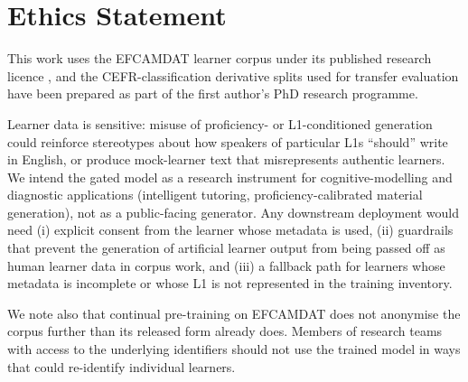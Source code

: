 \section*{Ethics Statement}
\label{sec:ethics}

This work uses the EFCAMDAT learner corpus under its published research
licence \citep{geertzen2014efcamdat}, and the CEFR-classification
derivative splits used for transfer evaluation have been prepared as
part of the first author's PhD research programme.

Learner data is sensitive: misuse of proficiency- or L1-conditioned
generation could reinforce stereotypes about how speakers of particular
L1s ``should'' write in English, or produce mock-learner text that
misrepresents authentic learners. We intend the gated model as a
research instrument for cognitive-modelling and diagnostic
applications (intelligent tutoring, proficiency-calibrated material
generation), not as a public-facing generator. Any downstream
deployment would need (i) explicit consent from the learner whose
metadata is used, (ii) guardrails that prevent the generation of
artificial learner output from being passed off as human learner data
in corpus work, and (iii) a fallback path for learners whose metadata
is incomplete or whose L1 is not represented in the training inventory.

We note also that continual pre-training on EFCAMDAT does not anonymise
the corpus further than its released form already does. Members of
research teams with access to the underlying identifiers should not
use the trained model in ways that could re-identify individual
learners.
